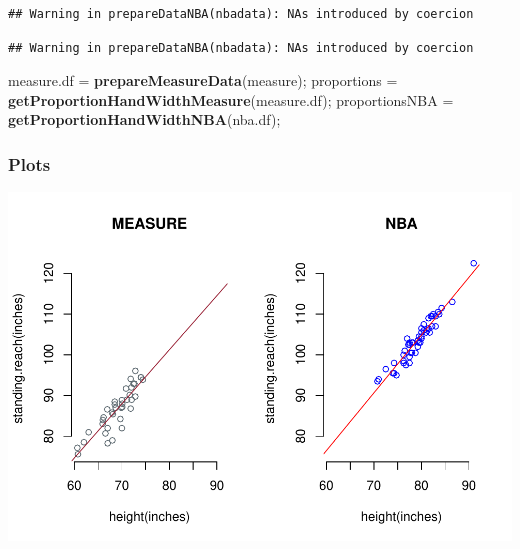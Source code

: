 \documentclass[]{article}
\newenvironment{Shaded}{\begin{snugshade}}{\end{snugshade}}
\newcommand{\CommentTok}[1]{\textcolor[rgb]{0.56,0.35,0.01}{\textit{#1}}}
\newcommand{\DataTypeTok}[1]{\textcolor[rgb]{0.13,0.29,0.53}{#1}}
\newcommand{\KeywordTok}[1]{\textcolor[rgb]{0.13,0.29,0.53}{\textbf{#1}}}
\newcommand{\NormalTok}[1]{#1}
\newcommand{\OperatorTok}[1]{\textcolor[rgb]{0.81,0.36,0.00}{\textbf{#1}}}
\newcommand{\StringTok}[1]{\textcolor[rgb]{0.31,0.60,0.02}{#1}}
\begin{document}
\begin{verbatim}
## Warning in prepareDataNBA(nbadata): NAs introduced by coercion
\end{verbatim}

\begin{verbatim}
## Warning in prepareDataNBA(nbadata): NAs introduced by coercion
\end{verbatim}

\begin{Shaded}
\begin{Highlighting}[]
\NormalTok{measure.df =}\StringTok{ }\KeywordTok{prepareMeasureData}\NormalTok{(measure);}
\NormalTok{proportions =}\StringTok{ }\KeywordTok{getProportionHandWidthMeasure}\NormalTok{(measure.df);}
\NormalTok{proportionsNBA =}\StringTok{ }\KeywordTok{getProportionHandWidthNBA}\NormalTok{(nba.df);}
\end{Highlighting}
\end{Shaded}

\subsubsection{Plots}
\label{sec:plots}

\begin{Shaded}
\end{Shaded}

\includegraphics{project-measure-writeup_files/figure-latex/plots-and-ttest-1.pdf}
\end{document}

